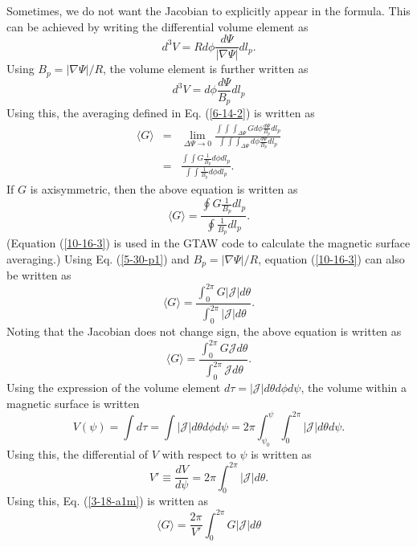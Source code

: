 \documentclass{article}
\begin{document}
Sometimes, we do not want the Jacobian to explicitly appear in the formula.
This can be achieved by writing the differential volume element as
\begin{equation}
  \label{6-14-1} d^3 V = R d \phi \frac{d \Psi}{| \nabla \Psi |} d l_p .
\end{equation}
Using $B_p = | \nabla \Psi | / R$, the volume element is further written as
\begin{equation}
  d^3 V = d \phi \frac{d \Psi}{B_p} d l_p
\end{equation}
Using this, the averaging defined in Eq. (\ref{6-14-2}) is written as
\begin{eqnarray}
  \langle G \rangle & = & \lim_{\Delta \Psi \rightarrow 0} \frac{\int \int
  \int_{\Delta \Psi} G d \phi \frac{d \Psi}{B_p} d l_p}{\int \int \int_{\Delta
  \Psi} d \phi \frac{d \Psi}{B_p} d l_p} \nonumber\\
  & = & \frac{\int \int G \frac{1}{B_p} d \phi d l_p}{\int \int \frac{1}{B_p}
  d \phi d l_p} . 
\end{eqnarray}
If $G$ is axisymmetric, then the above equation is written as
\begin{equation}
  \label{10-16-3} \langle G \rangle = \frac{\oint G \frac{1}{B_p} d l_p}{\oint
  \frac{1}{B_p} d l_p} .
\end{equation}
(Equation (\ref{10-16-3}) is used in the GTAW code to calculate the magnetic
surface averaging.) Using Eq. (\ref{5-30-p1}) and $B_p = | \nabla \Psi | / R$,
equation (\ref{10-16-3}) can also be written as
\begin{equation}
  \label{3-18-a1m} \langle G \rangle = \frac{\int_0^{2 \pi} G |\mathcal{J}| d
  \theta}{\int_0^{2 \pi} |\mathcal{J}| d \theta} .
\end{equation}
Noting that the Jacobian does not change sign, the above equation is written
as
\begin{equation}
  \langle G \rangle = \frac{\int_0^{2 \pi} G\mathcal{J}d \theta}{\int_0^{2
  \pi} \mathcal{J}d \theta} .
\end{equation}
Using the expression of the volume element $d \tau = |\mathcal{J}| d \theta d
\phi d \psi$, the volume within a magnetic surface is written
\begin{equation}
  \label{4-18-3} V (\psi) = \int d \tau = \int |\mathcal{J}| d \theta d \phi d
  \psi = 2 \pi \int_{\psi_0}^{\psi} \int_0^{2 \pi} |\mathcal{J}| d \theta d
  \psi .
\end{equation}
Using this, the differential of $V$ with respect to $\psi$ is written as
\begin{equation}
  \label{4-7-p1} V' \equiv \frac{d V}{d \psi} = 2 \pi \int_0^{2 \pi}
  |\mathcal{J}| d \theta .
\end{equation}
Using this, Eq. (\ref{3-18-a1m}) is written as
\begin{equation}
  \langle G \rangle = \frac{2 \pi}{V'} \int_0^{2 \pi} G |\mathcal{J}| d \theta
\end{equation}
\end{document}
